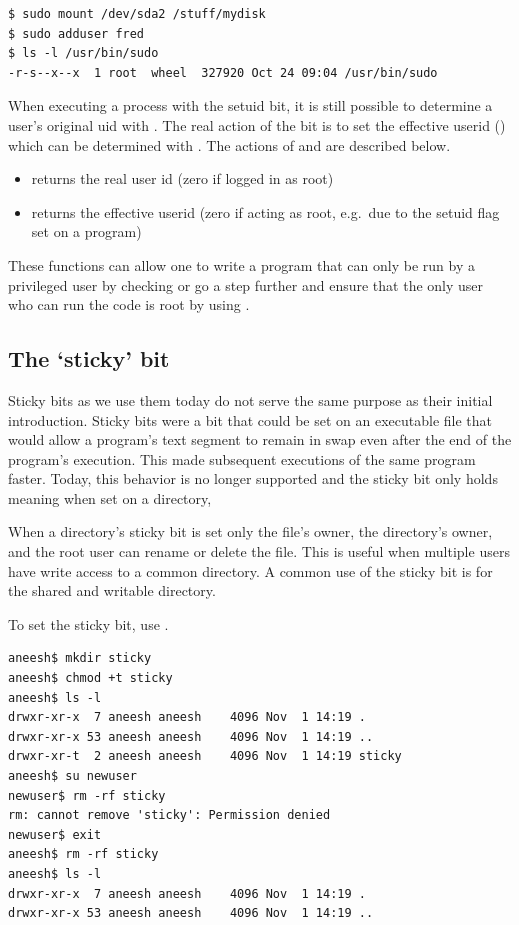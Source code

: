 \begin{verbatim}
$ sudo mount /dev/sda2 /stuff/mydisk
$ sudo adduser fred
$ ls -l /usr/bin/sudo
-r-s--x--x  1 root  wheel  327920 Oct 24 09:04 /usr/bin/sudo
\end{verbatim}

When executing a process with the setuid bit, it is still possible to determine a user's original uid with .
The real action of the  bit is to set the effective userid () which can be determined with .
The actions of  and  are described below.

\begin{itemize}
\tightlist
\item
   returns the real user id (zero if logged in as root)
\item
   returns the effective userid (zero if acting as root, e.g.~due to the setuid flag set on a program)
\end{itemize}

These functions can allow one to write a program that can only be run by a privileged user by checking  or go a step further and ensure that the only user who can run the code is root by using .

\subsection{The `sticky' bit}

Sticky bits as we use them today do not serve the same purpose as their initial introduction.
Sticky bits were a bit that could be set on an executable file that would allow a program's text segment to remain in swap even after the end of the program's execution.
This made subsequent executions of the same program faster.
Today, this behavior is no longer supported and the sticky bit only holds meaning when set on a directory,

When a directory's sticky bit is set only the file's owner, the directory's owner, and the root user can rename or delete the file.
This is useful when multiple users have write access to a common directory.
A common use of the sticky bit is for the shared and writable  directory.

To set the sticky bit, use .

\begin{verbatim}
aneesh$ mkdir sticky
aneesh$ chmod +t sticky
aneesh$ ls -l
drwxr-xr-x  7 aneesh aneesh    4096 Nov  1 14:19 .
drwxr-xr-x 53 aneesh aneesh    4096 Nov  1 14:19 ..
drwxr-xr-t  2 aneesh aneesh    4096 Nov  1 14:19 sticky
aneesh$ su newuser
newuser$ rm -rf sticky
rm: cannot remove 'sticky': Permission denied
newuser$ exit
aneesh$ rm -rf sticky
aneesh$ ls -l
drwxr-xr-x  7 aneesh aneesh    4096 Nov  1 14:19 .
drwxr-xr-x 53 aneesh aneesh    4096 Nov  1 14:19 ..
\end{verbatim}

